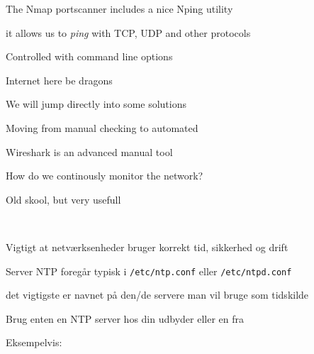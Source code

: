 \documentclass[Screen16to9,17pt]{foils}
\begin{document}
\begin{list2}
\item The Nmap portscanner includes a nice Nping utility
\item it allows us to \emph{ping} with TCP, UDP and other protocols
\item Controlled with command line options
\end{list2}








\vskip 2cm
\centerline{\Large Internet here be dragons}

We will jump directly into some solutions




\centerline{\LARGE Moving from manual checking to automated}


\begin{list2}
\item Wireshark is an advanced manual tool
\item How do we continously monitor the network?
\end{list2}





Old skool, but very usefull 







{~}

\begin{list1}
\item Vigtigt at netværksenheder bruger korrekt tid, sikkerhed og drift
\item Server NTP foregår typisk i \verb+/etc/ntp.conf+ eller \verb+/etc/ntpd.conf+
\item det vigtigste er navnet på den/de servere man vil bruge som tidskilde
\item Brug enten en NTP server hos din udbyder eller en fra 
\item Eksempelvis:
\end{list1}
\end{document}
